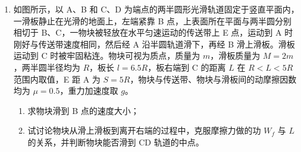 \documentclass[\gkver]{gaokaozhenti}
\begin{document}
\begin{enumerate}
{（3）考虑临界情况，如图所示。


① $qv_{3}B_{1}'=m\frac{v_{3}^{2}}{R_{0}}$，解得 $B_{1}'=\frac{mv_{3}}{qR_{0}}$；

② $qv_{3}B_{2}'=m\frac{v_{3}^{2}}{2R_{0}}$，解得 $B_{2}'=\frac{mv_{3}}{2qR_{0}}$，综合得 $B'<\frac{mv_{3}}{2qR_{0}}$。
}

\item
如图所示，以 A、B 和 C、D 为端点的两半圆形光滑轨道固定于竖直平面内，一滑板静止在光滑的地面上，左端紧靠 B 点，上表面所在平面与两半圆分别相切于 B、C，一物块被轻放在水平匀速运动的传送带上 E 点，运动到 A 时刚好与传送带速度相同，然后经 A 沿半圆轨道滑下，再经 B 滑上滑板。滑板运动到 C 时被牢固粘连。物块可视为质点，质量为 $m$，滑板质量为 $M=2m$，两半圆半径均为 $R$，板长 $l=6.5R$，板右端到 C 的距离 $L$ 在 $R<L<5R$ 范围内取值，E 距 A 为 $S=5R$，物块与传送带、物块与滑板间的动摩擦因数均为 $\mu=0.5$，重力加速度取 $g$。
\begin{enumerate}
	\item
	求物块滑到 B 点的速度大小；
	\item
	试讨论物块从滑上滑板到离开右端的过程中，克服摩擦力做的功 $W_{f}$ 与 $L$ 的关系，并判断物块能否滑到 CD 轨道的中点。
\end{enumerate}


\end{enumerate}
\end{document}
